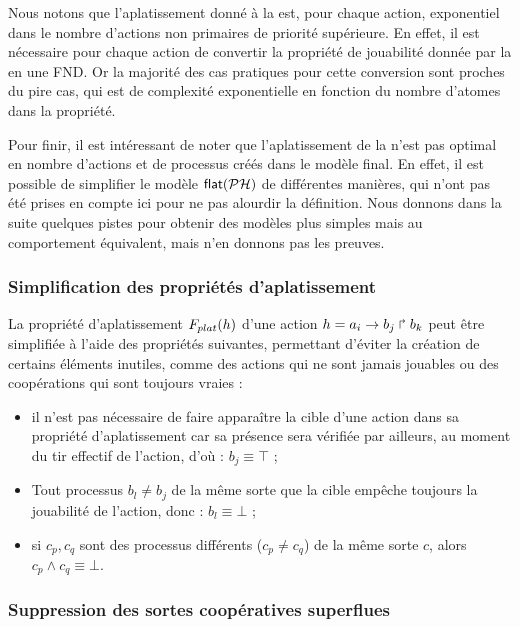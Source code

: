 Nous notons que l'aplatissement donné à la 
est, pour chaque action, exponentiel dans le nombre d'actions non primaires de
priorité supérieure.
En effet, il est nécessaire pour chaque action de convertir la propriété de jouabilité
donnée par la  en une FND.
Or la majorité des cas pratiques pour cette conversion sont proches du pire cas,
qui est de complexité exponentielle en fonction du nombre d'atomes dans la propriété.

Pour finir, il est intéressant de noter que l'aplatissement de la 
n'est pas optimal en nombre d'actions et de processus créés dans le modèle final.
En effet, il est possible de simplifier le modèle $\mathsf{flat}(\mathcal{PH})$ de différentes manières,
qui n'ont pas été prises en compte ici pour ne pas alourdir la définition.
Nous donnons dans la suite quelques pistes pour obtenir des modèles plus simples
mais au comportement équivalent, mais n'en donnons pas les preuves.

\subsubsection*{Simplification des propriétés d'aplatissement}

La propriété d'aplatissement $F_{plat}(h)$ d'une action $h = a_i\rightarrow b_j\Rsh b_k$ peut être
simplifiée à l'aide des propriétés suivantes, permettant d'éviter la création
de certains éléments inutiles, comme des actions qui ne sont jamais jouables
ou des coopérations qui sont toujours vraies :
\begin{itemize}
  \item il n'est pas nécessaire de faire apparaître la cible d'une action dans
    sa propriété d'aplatissement car sa présence sera vérifiée par ailleurs,
    au moment du tir effectif de l'action,
    d'où : $b_j \equiv \top$ ;
  \item Tout processus $b_l \neq b_j$ de la même sorte que la cible empêche toujours la jouabilité
    de l'action, donc : $b_l \equiv \bot$ ;
  \item si $c_p, c_q$ sont des processus différents ($c_p \neq c_q$) de la même sorte $c$,
    alors $c_p \wedge c_q \equiv \bot$.
\end{itemize}

\subsubsection*{Suppression des sortes coopératives superflues}

